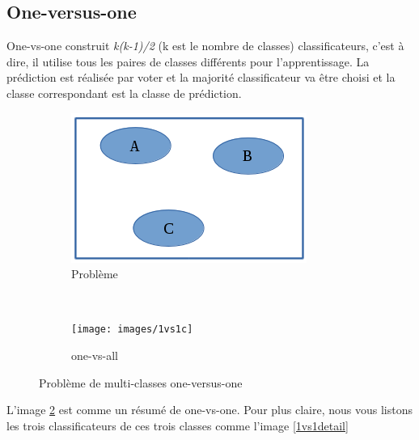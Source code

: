 \subsection{One-versus-one}
One-vs-one construit \textit{k(k-1)/2} (k est le nombre de classes) classificateurs, c'est à dire, il utilise tous les paires de classes différents pour l'apprentissage. La prédiction est réalisée par voter et la majorité classificateur va être choisi et la classe correspondant est la classe de prédiction. 


\begin{figure}[htbp!]
        \centering
        \begin{subfigure}[b]{0.5\textwidth}
                \includegraphics[width=\textwidth]{images/multiclass}
                \caption{Problème}
                \label{mclass}
        \end{subfigure}%
        ~ %
        \begin{subfigure}[b]{0.5\textwidth}
                \texttt{[image: images/1vs1c]}
                \caption{one-vs-all}
                \label{1vs1c}
        \end{subfigure}
        \caption{Problème de multi-classes one-versus-one}\label{mulclass}
\end{figure}


L'image \ref{1vs1c} est comme un résumé de one-vs-one. Pour plus claire, nous vous listons les trois classificateurs de ces trois classes comme l'image \ref{1vs1detail}

